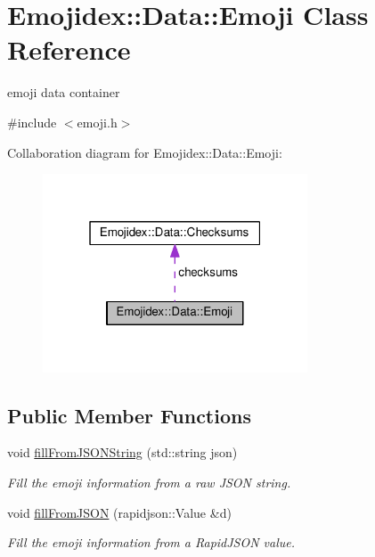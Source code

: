\hypertarget{classEmojidex_1_1Data_1_1Emoji}{}\section{Emojidex\+:\+:Data\+:\+:Emoji Class Reference}
\label{classEmojidex_1_1Data_1_1Emoji}


emoji data container  




{\ttfamily \#include $<$emoji.\+h$>$}



Collaboration diagram for Emojidex\+:\+:Data\+:\+:Emoji\+:\nopagebreak
\begin{figure}[H]
\begin{center}
\leavevmode
\includegraphics[width=223pt]{classEmojidex_1_1Data_1_1Emoji__coll__graph}
\end{center}
\end{figure}
\subsection*{Public Member Functions}
\begin{DoxyCompactItemize}
\item 
void \hyperlink{classEmojidex_1_1Data_1_1Emoji_a81aa3a7621b4393bc211c4d67a153182}{fill\+From\+J\+S\+O\+N\+String} (std\+::string json)\hypertarget{classEmojidex_1_1Data_1_1Emoji_a81aa3a7621b4393bc211c4d67a153182}{}\label{classEmojidex_1_1Data_1_1Emoji_a81aa3a7621b4393bc211c4d67a153182}

\begin{DoxyCompactList}\small\item\em Fill the emoji information from a raw J\+S\+ON string. \end{DoxyCompactList}\item 
void \hyperlink{classEmojidex_1_1Data_1_1Emoji_ad173ee5dee8d6f6e807674fe7c73812f}{fill\+From\+J\+S\+ON} (rapidjson\+::\+Value \&d)\hypertarget{classEmojidex_1_1Data_1_1Emoji_ad173ee5dee8d6f6e807674fe7c73812f}{}\label{classEmojidex_1_1Data_1_1Emoji_ad173ee5dee8d6f6e807674fe7c73812f}

\begin{DoxyCompactList}\small\item\em Fill the emoji information from a Rapid\+J\+S\+ON value. \end{DoxyCompactList}\end{DoxyCompactItemize}
